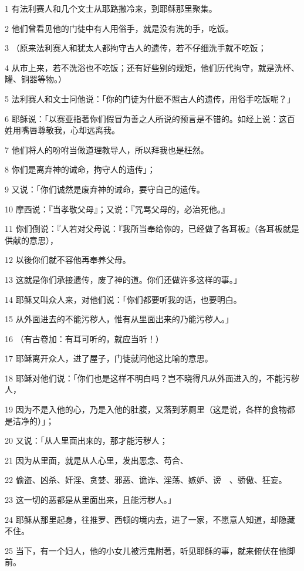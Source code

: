 \par 1 有法利赛人和几个文士从耶路撒冷来，到耶稣那里聚集。
\par 2 他们曾看见他的门徒中有人用俗手，就是没有洗的手，吃饭。
\par 3 （原来法利赛人和犹太人都拘守古人的遗传，若不仔细洗手就不吃饭；
\par 4 从市上来，若不洗浴也不吃饭；还有好些别的规矩，他们历代拘守，就是洗杯、罐、铜器等物。）
\par 5 法利赛人和文士问他说：「你的门徒为什麽不照古人的遗传，用俗手吃饭呢？」
\par 6 耶稣说：「以赛亚指著你们假冒为善之人所说的预言是不错的。如经上说：这百姓用嘴唇尊敬我，心却远离我。
\par 7 他们将人的吩咐当做道理教导人，所以拜我也是枉然。
\par 8 你们是离弃神的诫命，拘守人的遗传」；
\par 9 又说：「你们诚然是废弃神的诫命，要守自己的遗传。
\par 10 摩西说：『当孝敬父母』；又说：『咒骂父母的，必治死他。』
\par 11 你们倒说：『人若对父母说：『我所当奉给你的，已经做了各耳板』（各耳板就是供献的意思），
\par 12 以後你们就不容他再奉养父母。
\par 13 这就是你们承接遗传，废了神的道。你们还做许多这样的事。」
\par 14 耶稣又叫众人来，对他们说：「你们都要听我的话，也要明白。
\par 15 从外面进去的不能污秽人，惟有从里面出来的乃能污秽人。」
\par 16 （有古卷加：有耳可听的，就应当听！）
\par 17 耶稣离开众人，进了屋子，门徒就问他这比喻的意思。
\par 18 耶稣对他们说：「你们也是这样不明白吗？岂不晓得凡从外面进入的，不能污秽人，
\par 19 因为不是入他的心，乃是入他的肚腹，又落到茅厕里（这是说，各样的食物都是洁净的）」；
\par 20 又说：「从人里面出来的，那才能污秽人；
\par 21 因为从里面，就是从人心里，发出恶念、苟合、
\par 22 偷盗、凶杀、奸淫、贪婪、邪恶、诡诈、淫荡、嫉妒、谤　、骄傲、狂妄。
\par 23 这一切的恶都是从里面出来，且能污秽人。」
\par 24 耶稣从那里起身，往推罗、西顿的境内去，进了一家，不愿意人知道，却隐藏不住。
\par 25 当下，有一个妇人，他的小女儿被污鬼附著，听见耶稣的事，就来俯伏在他脚前。

